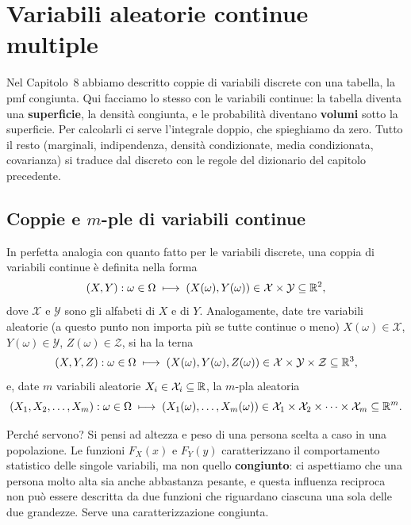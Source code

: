 \chapter{Variabili aleatorie continue multiple}

Nel Capitolo~8 abbiamo descritto coppie di variabili discrete con una tabella, la pmf congiunta. Qui facciamo lo
stesso con le variabili continue: la tabella diventa una \textbf{superficie}, la densità congiunta, e le probabilità
diventano \textbf{volumi} sotto la superficie. Per calcolarli ci serve l'integrale doppio, che spieghiamo da zero.
Tutto il resto (marginali, indipendenza, densità condizionate, media condizionata, covarianza) si traduce dal discreto
con le regole del dizionario del capitolo precedente.

\section{Coppie e \texorpdfstring{$m$}{m}-ple di variabili continue}

In perfetta analogia con quanto fatto per le variabili discrete, una coppia di variabili continue è definita nella
forma
\[ (X, Y) : \omega \in \Omega \;\longmapsto\; \left( X(\omega), Y(\omega) \right) \in \mathcal{X} \times \mathcal{Y}
   \subseteq \mathbb{R}^2 , \]
dove $\mathcal{X}$ e $\mathcal{Y}$ sono gli alfabeti di $X$ e di $Y$. Analogamente, date tre variabili aleatorie (a
questo punto non importa più se tutte continue o meno) $X(\omega) \in \mathcal{X}$, $Y(\omega) \in \mathcal{Y}$,
$Z(\omega) \in \mathcal{Z}$, si ha la terna
\[ (X, Y, Z) : \omega \in \Omega \;\longmapsto\; \left( X(\omega), Y(\omega), Z(\omega) \right) \in \mathcal{X} \times
   \mathcal{Y} \times \mathcal{Z} \subseteq \mathbb{R}^3 , \]
e, date $m$ variabili aleatorie $X_i \in \mathcal{X}_i \subseteq \mathbb{R}$, la $m$-pla aleatoria
\[ (X_1, X_2, \ldots, X_m) : \omega \in \Omega \;\longmapsto\; \left( X_1(\omega), \ldots, X_m(\omega) \right) \in
   \mathcal{X}_1 \times \mathcal{X}_2 \times \cdots \times \mathcal{X}_m \subseteq \mathbb{R}^m . \]

Perché servono? Si pensi ad altezza e peso di una persona scelta a caso in una popolazione. Le funzioni $F_X(x)$ e
$F_Y(y)$ caratterizzano il comportamento statistico delle singole variabili, ma non quello \textbf{congiunto}: ci
aspettiamo che una persona molto alta sia anche abbastanza pesante, e questa influenza reciproca non può essere
descritta da due funzioni che riguardano ciascuna una sola delle due grandezze. Serve una caratterizzazione congiunta.

